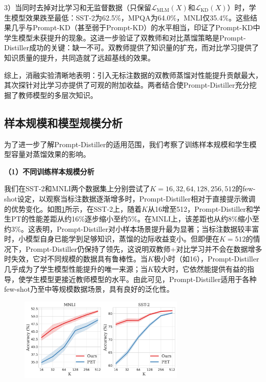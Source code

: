 \documentclass[../main.tex]{subfiles}
\begin{document}
3）当同时去掉对比学习和无监督数据（只保留$\mathcal{L}_{\text{MLM}}(X)$和$\mathcal{L}_{\text{KD}}(X)$）时，学生模型效果跌至最低：SST-2为62.5\%，MPQA为64.0\%，MNLI仅35.4\%。这些结果几乎与Prompt-KD（甚至弱于Prompt-KD）的水平相当，印证了Prompt-KD中学生模型未获提升的现象。这进一步验证了双教师和对比蒸馏策略是Prompt-Distiller成功的关键：缺一不可。双教师提供了知识量的扩充，而对比学习提供了知识质量的提升，共同造就了远超基线的效果。

综上，消融实验清晰地表明：引入无标注数据的双教师蒸馏对性能提升贡献最大，其次探针对比学习亦提供了可观的附加收益。两者结合使Prompt-Distiller充分挖掘了教师模型的多层次知识。

\subsection{样本规模和模型规模分析}
\label{sec:3-5-4}
为了进一步了解Prompt-Distiller的适用范围，我们考察了训练样本规模和学生模型容量对蒸馏效果的影响。

\vspace{1em}
\textbf{（1）不同训练样本规模分析}
\vspace{0.5em}

我们在SST-2和MNLI两个数据集上分别尝试了$K=16, 32, 64, 128, 256, 512$的few-shot设定，以观察当标注数据逐渐增多时，Prompt-Distiller相对于直接提示微调的优势变化。如图\ref{fig:datasize}所示，在SST-2上，随着$K$从16增至512，Prompt-Distiller和学生PT的性能差距从约16\%逐步缩小至约5\%。在MNLI上，该差距也从约8\%缩小至约3\%。这表明，Prompt-Distiller对小样本场景提升最为显著；当标注数据较丰富时，小模型自身已能学到足够知识，蒸馏的边际收益变小。但即便在$K=512$的情况下，Prompt-Distiller仍保持了领先，这说明双教师+对比学习并不会在数据增多时失效，它对不同规模的数据具有鲁棒性。当$K$极小时（如16），Prompt-Distiller几乎成为了学生模型性能提升的唯一来源；当$K$较大时，它依然能提供有益的指导，使学生模型更接近教师模型的水平。由此可见，Prompt-Distiller适用于各种few-shot乃至中等规模数据场景，具有良好的泛化性。

\begin{figure}[htbp]
	\centering
	\includegraphics[width=0.7\textwidth]{plot.pdf}
	\label{fig:datasize}
\end{figure}
\end{document}
